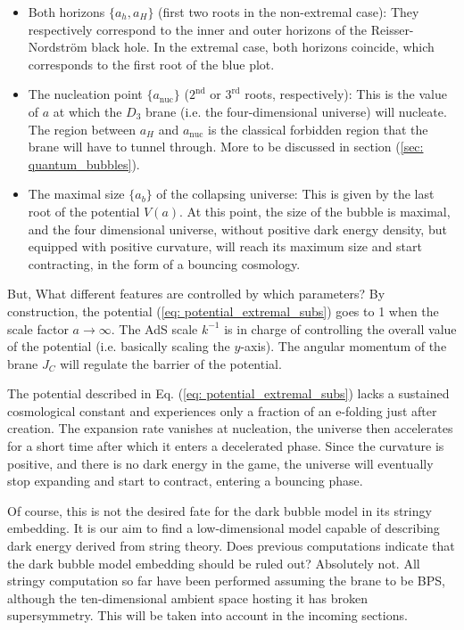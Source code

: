 \begin{itemize}
    \item Both horizons $\{a_{h}, a_{H}\}$ (first two roots in the non-extremal case): They respectively correspond to the inner and outer horizons of the Reisser-Nordström black hole. In the extremal case, both horizons coincide, which corresponds to the first root of the blue plot. 
    \item The nucleation point $\{a_{\text{nuc}}\}$ ($2^{\text{nd}}$ or $3^{\text{rd}}$ roots, respectively): This is the value of $a$ at which the $D_{3}$ brane (i.e. the four-dimensional universe) will nucleate. The region between $a_{H}$ and $a_{\text{nuc}}$ is the classical forbidden region that the brane will have to tunnel through. More to be discussed in section (\ref{sec: quantum_bubbles}).
    \item The maximal size $\{a_{b}\}$ of the collapsing universe:  This is given by the last root of the potential $V(a)$. At this point, the size of the bubble is maximal, and the four dimensional universe, without positive dark energy density, but equipped with positive curvature, will reach its maximum size and start contracting, in the form of a bouncing cosmology.
\end{itemize}
But, What different features are controlled by which parameters? By construction, the potential (\ref{eq: potential_extremal_subs}) goes to 1 when the scale factor $a\rightarrow \infty$. The AdS scale $k^{-1}$ is in charge of controlling the overall value of the potential (i.e. basically scaling the $y$-axis). The angular momentum of the brane $J_{C}$ will regulate the barrier of the potential.

The potential described in Eq. (\ref{eq: potential_extremal_subs}) lacks a sustained cosmological constant and experiences only a fraction of an e-folding just after creation. The expansion rate vanishes at nucleation, the universe then accelerates for a short time after which it enters a decelerated phase. Since the curvature is positive, and there is no dark energy in the game, the universe will eventually stop expanding and start to contract, entering a bouncing phase. 

Of course, this is not the desired fate for the dark bubble model in its stringy embedding. It is our aim to find a low-dimensional model capable of describing dark energy derived from string theory. Does previous computations indicate that the dark bubble model embedding should be ruled out? Absolutely not. All stringy computation so far have been performed assuming the brane to be BPS, although the ten-dimensional ambient space hosting it has broken supersymmetry. This will be taken into account in the incoming sections.


